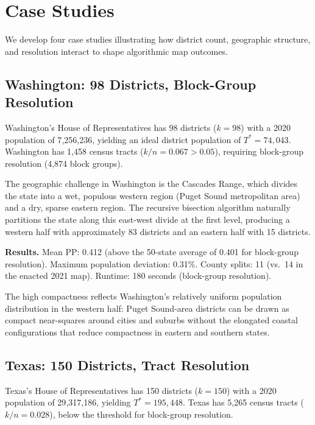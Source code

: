 \section{Case Studies}
\label{sec:cases}

We develop four case studies illustrating how district count, geographic
structure, and resolution interact to shape algorithmic map outcomes.

\subsection{Washington: 98 Districts, Block-Group Resolution}
\label{sec:cases:wa}

Washington's House of Representatives has 98 districts ($k=98$) with a 2020
population of 7{,}256{,}236, yielding an ideal district population of $T^* = 74{,}043$.
Washington has 1{,}458 census tracts ($k/n = 0.067 > 0.05$), requiring
block-group resolution (4{,}874 block groups).

The geographic challenge in Washington is the Cascades Range, which divides the
state into a wet, populous western region (Puget Sound metropolitan area) and a
dry, sparse eastern region. The recursive bisection algorithm naturally partitions
the state along this east-west divide at the first level, producing a western half
with approximately 83 districts and an eastern half with 15 districts.

\textbf{Results.} Mean PP: 0.412 (above the 50-state average of 0.401 for
block-group resolution). Maximum population deviation: 0.31\%. County splits:
11 (vs.\ 14 in the enacted 2021 map). Runtime: 180 seconds (block-group resolution).

The high compactness reflects Washington's relatively uniform population
distribution in the western half: Puget Sound-area districts can be drawn as
compact near-squares around cities and suburbs without the elongated coastal
configurations that reduce compactness in eastern and southern states.

\subsection{Texas: 150 Districts, Tract Resolution}
\label{sec:cases:tx}

Texas's House of Representatives has 150 districts ($k=150$) with a 2020
population of 29{,}317{,}186, yielding $T^* = 195{,}448$. Texas has 5{,}265
census tracts ($k/n = 0.028$), below the threshold for block-group resolution.

